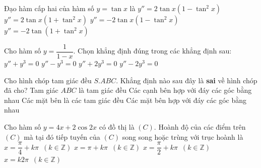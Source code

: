 \begin{ex}%
	Đạo hàm cấp hai của hàm số $y = \tan x$ là
	\choice
	{$y'' = 2\tan x \left(1 - \tan^2 x \right)$}
	{\True $y'' = 2\tan x \left(1 + \tan^2 x \right)$}
	{$y'' =  - 2\tan x \left(1 - \tan^2 x \right)$}
	{$y'' =  - 2\tan \left(1 + \tan^2 x \right)$}
\end{ex} 
\begin{ex}%
	Cho hàm số $y = \dfrac{1}{{1 - x}}$. Chọn khẳng định đúng trong các khẳng định sau:
	\choice
	{$y'' + y^3 = 0$}
	{$y'' - y^3 = 0$}
	{$y'' + 2y^3 = 0$}
	{\True $y'' - 2y^3 = 0$}
\end{ex}


\begin{ex}%
	Cho hình chóp tam giác đều $S.ABC$. Khẳng định nào sau đây là \textbf{sai} về hình chóp đã cho? 
	\choice
	{Tam giác $ABC$ là tam giác đều}
	{Các cạnh bên hợp với đáy các góc bằng nhau}
	{\True Các mặt bên là các tam giác đều}
	{Các mặt bên hợp với đáy các góc bằng nhau}
\end{ex}


\begin{ex}%
	Cho hàm số $y = 4x + 2\cos 2x$ có đồ thị là $(C)$. Hoành độ của các điểm trên $(C)$ mà tại đó tiếp tuyến của $(C)$ song song hoặc trùng với trục hoành là
	\choice
	{\True $x = \dfrac{\pi}{4} + k\pi \enspace \left( k \in \mathbb{Z} \right)$}
	{$x = \pi  + k\pi \enspace \left( k \in \mathbb{Z} \right)$}
	{$x = \dfrac{\pi}{2} + k\pi \enspace \left( k \in \mathbb{Z} \right)$}
	{$x = k2\pi \enspace \left( k \in \mathbb{Z} \right)$}
\end{ex}

